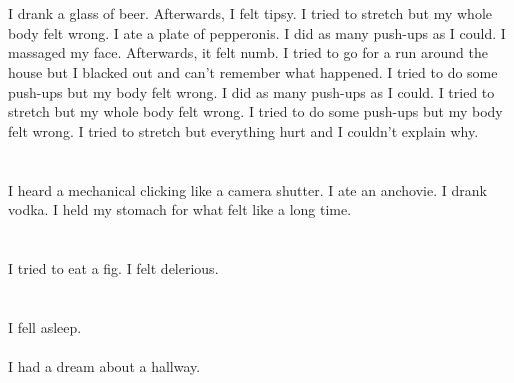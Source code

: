 \documentclass{article}
\begin{document}
    \section{}
    I drank a glass of beer. Afterwards, I felt tipsy. I tried to stretch but my whole body felt wrong. I ate a plate of pepperonis.  I did as many push-ups as I could.  I massaged my face. Afterwards, it felt numb.  I tried to go for a run around the house but I blacked out and can't remember what happened.  I tried to do some push-ups but my body felt wrong.   I did as many push-ups as I could.  I tried to stretch but my whole body felt wrong.  I tried to do some push-ups but my body felt wrong.  I tried to stretch but everything hurt and I couldn't explain why.  
    \newpage
    
    \section{}
    I heard a mechanical clicking like a camera shutter. I ate an anchovie. I drank vodka. I held my stomach for what felt like a long time.  
    \newpage
    
    \section{}
    I tried to eat a fig. I felt delerious.  
    \newpage
    
    \section{}
    I fell asleep.\\\\I had a dream about a hallway.\\\\ 
    \newpage
    
\end{document}

